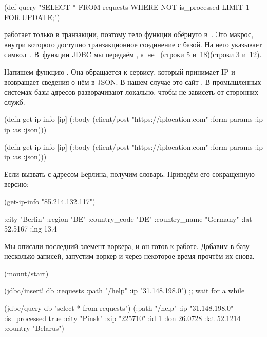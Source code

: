 \begin{clojure}
(def query
  "SELECT * FROM requests WHERE NOT is_processed
   LIMIT 1 FOR UPDATE;")
\end{clojure}

\fi

 работает только в транзакции, поэтому тело функции обёрнуто
в~. Это макрос, внутри которого доступно
транзакционное соединение с базой. На него указывает символ~. В~функции
JDBC мы передаём , а~не~ \ifnarrow(строки 5 и~18)\else(строки 3 и~12)\fi.


Напишем функцию . Она обращается к сервису, который принимает
IP и возвращает сведения о нём в JSON. В нашем случае это сайт
. В промышленных системах базы адресов разворачивают
локально, чтобы не зависеть от сторонних служб.

\ifnarrow

\begin{clojure}
(defn get-ip-info [ip]
  (:body (client/post
           "https://iplocation.com"
           {:form-params {:ip ip}
            :as :json})))
\end{clojure}

\else

\begin{clojure}
(defn get-ip-info [ip]
  (:body (client/post "https://iplocation.com"
                      {:form-params {:ip ip}
                       :as :json})))
\end{clojure}

\fi

\noindent
Если вызвать  с адресом Берлина, получим словарь. Приведём его
сокращенную версию:

\begin{clojure}
(get-ip-info "85.214.132.117")

{:city "Berlin"
 :region "BE"
 :country_code "DE"
 :country_name "Germany"
 :lat 52.5167
 :lng 13.4}
\end{clojure}

Мы описали последний элемент воркера, и он готов к работе. Добавим в базу
несколько записей, запустим воркер и через некоторое время прочтём их снова.

\pagebreaklarge[3]

\ifnarrow

\begin{clojure}
(mount/start)

(jdbc/insert! db :requests
  {:path "/help" :ip "31.148.198.0"})
;; wait for a while

(jdbc/query db "select * from requests")
({:path "/help"
  :ip "31.148.198.0"
  :is_processed true
  :city "Pinsk"
  :zip "225710" :id 1
  :lon 26.0728 :lat 52.1214
  :country "Belarus"})
\end{clojure}

